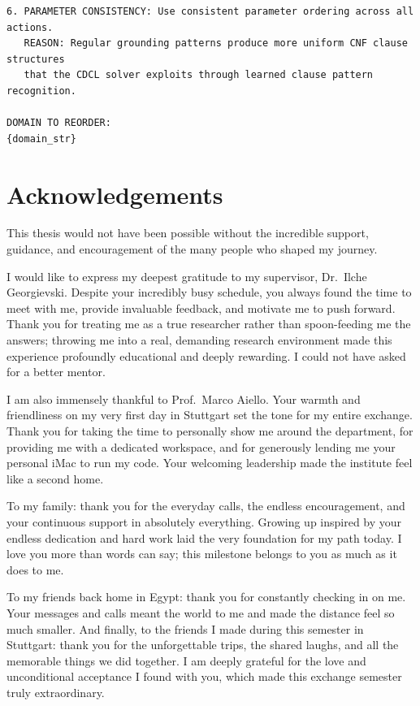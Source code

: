\documentclass[
  numbers=noenddot,
  english,  %
  a4paper,  %
  oneside,  %
  bibliography=totoc,
  headsepline,
  cleardoublepage=empty,
  parskip=half,
  draft=false
]{scrbook}
\theoremstyle{break}
\begin{document}
\begin{lstlisting}[language={}, caption={Architecture-aware prompt for Madagascar (MpC).}, label={lst:prompt:madagascar}, basicstyle=\small\ttfamily, numbers=none, frame=single, breaklines=true]
6. PARAMETER CONSISTENCY: Use consistent parameter ordering across all actions.
   REASON: Regular grounding patterns produce more uniform CNF clause structures
   that the CDCL solver exploits through learned clause pattern recognition.

DOMAIN TO REORDER:
{domain_str}
\end{lstlisting}


\chapter*{Acknowledgements}

This thesis would not have been possible without the incredible support, guidance, and encouragement of the many people who shaped my journey.

I would like to express my deepest gratitude to my supervisor, Dr.\ Ilche Georgievski. Despite your incredibly busy schedule, you always found the time to meet with me, provide invaluable feedback, and motivate me to push forward. Thank you for treating me as a true researcher rather than spoon-feeding me the answers; throwing me into a real, demanding research environment made this experience profoundly educational and deeply rewarding. I could not have asked for a better mentor.

I am also immensely thankful to Prof.\ Marco Aiello. Your warmth and friendliness on my very first day in Stuttgart set the tone for my entire exchange. Thank you for taking the time to personally show me around the department, for providing me with a dedicated workspace, and for generously lending me your personal iMac to run my code. Your welcoming leadership made the institute feel like a second home.

To my family: thank you for the everyday calls, the endless encouragement, and your continuous support in absolutely everything. Growing up inspired by your endless dedication and hard work laid the very foundation for my path today. I love you more than words can say; this milestone belongs to you as much as it does to me.

To my friends back home in Egypt: thank you for constantly checking in on me. Your messages and calls meant the world to me and made the distance feel so much smaller. And finally, to the friends I made during this semester in Stuttgart: thank you for the unforgettable trips, the shared laughs, and all the memorable things we did together. I am deeply grateful for the love and unconditional acceptance I found with you, which made this exchange semester truly extraordinary.
\end{document}

